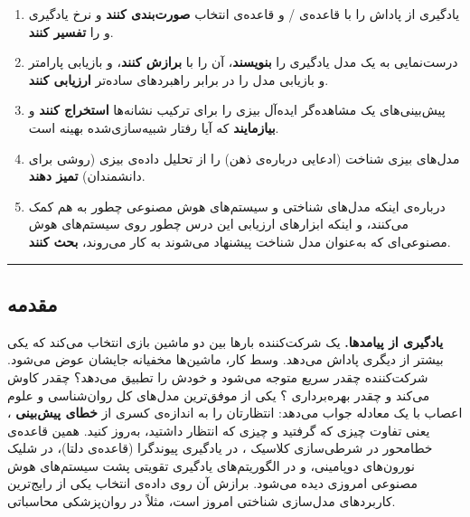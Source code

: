 \begin{enumerate}
\def\labelenumi{\arabic{enumi}.}
\tightlist
\item
  یادگیری از پاداش را با قاعده‌ی  / 
  و قاعده‌ی انتخاب  \textbf{صورت‌بندی کنند} و نرخ یادگیری و
   را \textbf{تفسیر کنند}.
\item
  درست‌نمایی  به  یک مدل یادگیری را \textbf{بنویسند}،
  آن را با  \textbf{برازش کنند}، و بازیابی پارامتر و بازیابی مدل
  را در برابر راهبردهای ساده‌تر \textbf{ارزیابی کنند}.
\item
  پیش‌بینی‌های یک مشاهده‌گر ایده‌آل بیزی  را
  برای ترکیب نشانه‌ها \textbf{استخراج کنند} و \textbf{بیازمایند} که آیا
  رفتار شبیه‌سازی‌شده بهینه است.
\item
  مدل‌های بیزی شناخت (ادعایی درباره‌ی ذهن) را از تحلیل داده‌ی بیزی (روشی
  برای دانشمندان) \textbf{تمیز دهند}.
\item
  درباره‌ی اینکه مدل‌های شناختی و سیستم‌های هوش مصنوعی چطور به هم کمک
  می‌کنند، و اینکه ابزارهای ارزیابی این درس چطور روی سیستم‌های هوش
  مصنوعی‌ای که به‌عنوان مدل شناخت پیشنهاد می‌شوند به کار می‌روند،
  \textbf{بحث کنند}.
\end{enumerate}

\begin{center}\rule{0.5\linewidth}{0.5pt}\end{center}

\subsection{مقدمه}

\textbf{یادگیری از پیامدها.} یک شرکت‌کننده بارها بین دو ماشین بازی انتخاب
می‌کند که یکی بیشتر از دیگری پاداش می‌دهد. وسط کار، ماشین‌ها مخفیانه جایشان
عوض می‌شود. شرکت‌کننده چقدر سریع متوجه می‌شود و خودش را تطبیق می‌دهد؟ چقدر
کاوش  می‌کند و چقدر بهره‌برداری ؟ یکی از
موفق‌ترین مدل‌های کل روان‌شناسی و علوم اعصاب با یک معادله جواب می‌دهد:
انتظارتان را به اندازه‌ی کسری از \textbf{خطای پیش‌بینی} ، یعنی تفاوت چیزی که گرفتید و چیزی که انتظار داشتید، به‌روز کنید.
همین قاعده‌ی خطامحور در شرطی‌سازی کلاسیک ، در
یادگیری پیوندگرا (قاعده‌ی دلتا)، در شلیک نورون‌های دوپامینی، و در
الگوریتم‌های یادگیری تقویتی پشت سیستم‌های هوش مصنوعی امروزی دیده می‌شود.
برازش آن روی داده‌ی انتخاب یکی از رایج‌ترین کاربردهای مدل‌سازی شناختی امروز
است، مثلاً در روان‌پزشکی محاسباتی.

